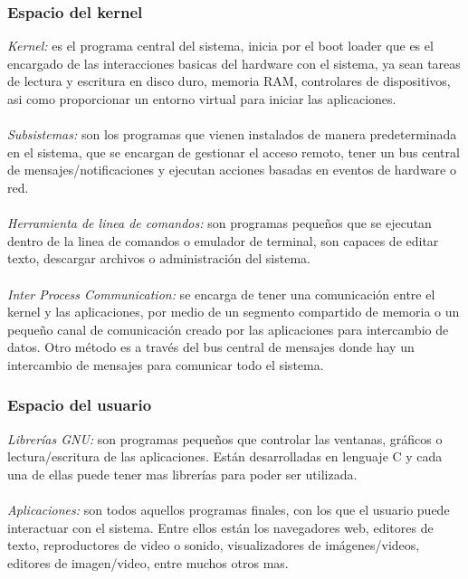 \documentclass[10pt,a4paper,titlepage]{article}
\begin{document}
	\subsubsection*{Espacio del kernel}
	
	\emph{Kernel:} es el programa central del sistema, inicia por el boot loader que es el encargado de las interacciones basicas del hardware con el sistema, ya sean tareas de lectura y escritura en disco duro, memoria RAM, controlares de dispositivos, asi como proporcionar un entorno virtual para iniciar las aplicaciones.
	\\
	\\
	\emph{Subsistemas:} son los programas que vienen instalados de manera predeterminada en el sistema, que se encargan de gestionar el acceso remoto, tener un bus central de mensajes/notificaciones y ejecutan acciones basadas en eventos de hardware o red.
	\\
	\\
	\emph{Herramienta de linea de comandos:} son programas pequeños que se ejecutan dentro de la linea de comandos o emulador de terminal, son capaces de editar texto, descargar archivos o administración del sistema.
	\\
	\\
	\emph{Inter Process Communication:} se encarga de tener una comunicación entre el kernel y las aplicaciones, por medio de un segmento compartido de memoria o un pequeño canal de comunicación creado por las aplicaciones para intercambio de datos. Otro método es a través del bus central de mensajes donde hay un intercambio de mensajes para comunicar todo el sistema. 
	
	\subsubsection*{Espacio del usuario}
	\emph{Librerías GNU:} son programas pequeños que controlar las ventanas, gráficos o lectura/escritura de las aplicaciones. Están desarrolladas en lenguaje C y cada una de ellas puede tener mas librerías para poder ser utilizada.
	\\
	\\
	\emph{Aplicaciones:} son todos aquellos programas finales, con los que el usuario puede interactuar con el sistema. Entre ellos están los navegadores web, editores de texto, reproductores de video o sonido, visualizadores de imágenes/videos, editores de imagen/video, entre muchos otros mas.
	
\end{document}
